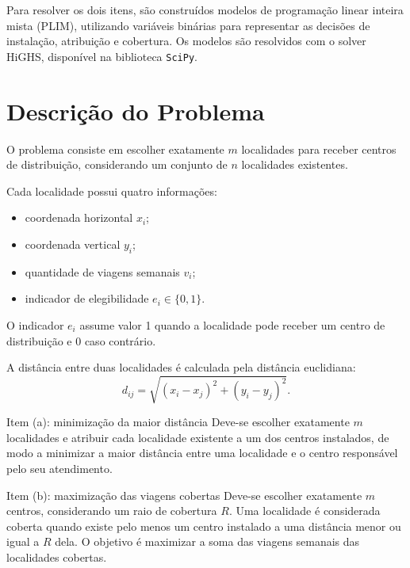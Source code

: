 \documentclass[12pt,a4paper]{article}
\begin{document}
Para resolver os dois itens, são construídos modelos de
programação linear inteira mista (PLIM), utilizando variáveis
binárias para representar as decisões de instalação,
atribuição e cobertura. Os modelos são resolvidos com o
solver HiGHS, disponível na biblioteca \texttt{SciPy}.

\section{Descrição do Problema}

O problema consiste em escolher exatamente $m$ localidades
para receber centros de distribuição, considerando um
conjunto de $n$ localidades existentes.

Cada localidade possui quatro informações:

\begin{itemize}
    \item coordenada horizontal $x_i$;
    \item coordenada vertical $y_i$;
    \item quantidade de viagens semanais $v_i$;
    \item indicador de elegibilidade $e_i \in \{0,1\}$.
\end{itemize}

O indicador $e_i$ assume valor 1 quando a localidade pode
receber um centro de distribuição e 0 caso contrário.

A distância entre duas localidades é calculada pela distância
euclidiana:
\begin{equation}
d_{ij} = \sqrt{(x_i-x_j)^2+(y_i-y_j)^2}.
\end{equation}

Item (a): minimização da maior distância
Deve-se escolher exatamente $m$ localidades e atribuir cada
localidade existente a um dos centros instalados, de modo a
minimizar a maior distância entre uma localidade e o centro
responsável pelo seu atendimento.

Item (b): maximização das viagens cobertas
Deve-se escolher exatamente $m$ centros, considerando um
raio de cobertura $R$. Uma localidade é considerada coberta
quando existe pelo menos um centro instalado a uma distância
menor ou igual a $R$ dela. O objetivo é maximizar a soma das
viagens semanais das localidades cobertas.

\end{document}
